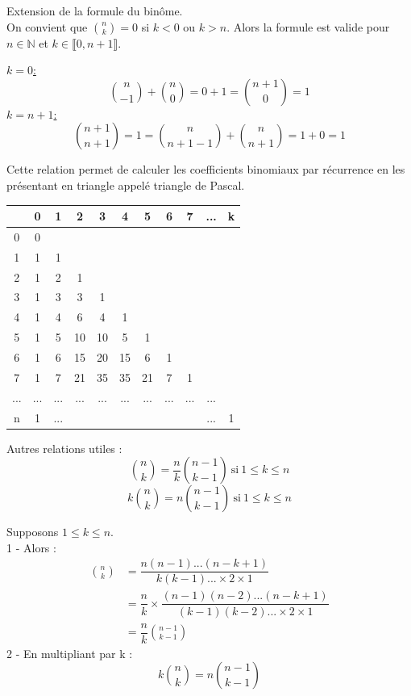 \documentclass[a4paper,11pt]{article}
\newcommand{\N}{\mathbb{N}}
\newcommand{\intN}[2]{\llbracket #1, #2 \rrbracket}
\newcommand{\encadLEQ}[3]{#1 \leq #2 \leq #3}
\begin{document}
\newpage

\begin{remarque}
	Extension de la formule du binôme. \\
	On convient que $\binom{n}{k} = 0$ si $k < 0$ ou $k > n$. Alors la formule est valide pour $n\in\N$ et $k\in\intN{0}{n+1}$.
	
	\underline{$k = 0$:} $$\binom{n}{-1} + \binom{n}{0} = 0 + 1 = \binom{n+1}{0} = 1$$
	\underline{$k = n+1$:} $$\binom{n+1}{n+1} = 1 = \binom{n}{n + 1 - 1} + \binom{n}{n+1} = 1 + 0 = 1$$	
\end{remarque}

\medskip

Cette relation permet de calculer les coefficients binomiaux par récurrence en les présentant en triangle appelé triangle de Pascal.
\begin{center}
	\begin{tabular}{|c|cccccccccc|}
		\hline
		& 0 & 1 & 2 & 3 & 4 & 5 & 6 & 7 & ... & k \\
		\hline
		0 & 0 &&&&&&&&& \\
		1 & 1 & 1 &&&&&&&& \\
		2 & 1 & 2 & 1 &&&&&&& \\
		3 & 1 & 3 & 3 & 1 &&&&&& \\
		4 & 1 & 4 & 6 & 4 & 1 &&&&& \\
		5 & 1 & 5 & 10 & 10 & 5 & 1 &&&& \\
		6 & 1 & 6 & 15 & 20 & 15 & 6 & 1 &&& \\
		7 & 1 & 7 & 21 & 35 & 35 & 21 & 7 & 1 && \\
		... & ... & ... & ... & ... & ... & ... & ... & ... & ... & \\
		n & 1 & ... &&&&&&& ... & 1 \\
		\hline		
	\end{tabular}
\end{center}

\begin{proposition}
	Autres relations utiles :
	$$\binom{n}{k} = \dfrac{n}{k}\binom{n-1}{k-1} \: \text{si} \: \encadLEQ{1}{k}{n}$$
	$$k\binom{n}{k} = n\binom{n-1}{k-1} \: \text{si} \: \encadLEQ{1}{k}{n}$$
\end{proposition}

\begin{demonstration}
	Supposons $\encadLEQ{1}{k}{n}$. \\
	1 - Alors :
	\begin{align*}
		\binom{n}{k} &= \dfrac{n(n-1)...(n-k+1)}{k(k-1)...\times 2 \times 1} \\
		&= \dfrac{n}{k} \times \dfrac{(n-1)(n-2)...(n-k+1)}{(k-1)(k-2)...\times 2 \times 1} \\
		&= \dfrac{n}{k}\binom{n-1}{k-1}
	\end{align*}
	2 - En multipliant par k :
	$$k\binom{n}{k} = n\binom{n-1}{k-1}$$
\end{demonstration}
\end{document}
